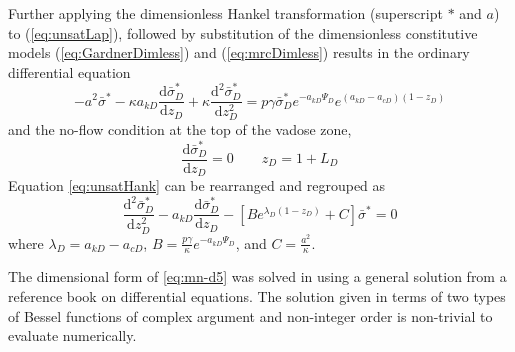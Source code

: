 \documentclass[12pt,letterpaper]{article}
\begin{document}
Further applying the dimensionless Hankel transformation (superscript $\ast$ and $a$) to (\ref{eq:unsatLap}), followed by substitution of the dimensionless constitutive models (\ref{eq:GardnerDimless}) and (\ref{eq:mrcDimless}) results in the ordinary differential equation
\begin{equation}
  \label{eq:unsatHank}
   -a^2 \bar{\sigma}^{\ast} - \kappa a_{kD} \frac{\mathrm{d} \bar{\sigma}_D^{\ast}}{\mathrm{d} z_D} + \kappa \frac{\mathrm{d}^2 \bar{\sigma}_D^{\ast}}{\mathrm{d} z_D^2}  = p \gamma \bar{\sigma}_D^{\ast}  e^{-a_{kD} \Psi_D}  e^{\left(a_{kD} -a_{cD} \right)\left( 1 - z_D\right)}  
\end{equation}
and the no-flow condition at the top of the vadose zone, 
\begin{equation}\nonumber
 \frac{\mathrm{d}\bar{\sigma}_D^{\ast}}{\mathrm{d}z_D}=0 \qquad z_D=1+L_D 
\end{equation}
Equation \ref{eq:unsatHank} can be rearranged and regrouped as
\begin{equation}
  \label{eq:mn-d5}
  \frac{\mathrm{d}^2 \bar{\sigma}_D^{\ast}}{\mathrm{d}z_D^2} - a_{kD} \frac{\mathrm{d} \bar{\sigma}_D^{\ast}}{\mathrm{d}z_D} - \left[ B e^{\lambda_D (1-z_D)} + C\right] \bar{\sigma}^{\ast}=0
\end{equation}
where $\lambda_D = a_{kD} - a_{cD}$, $B = \frac{p\gamma}{\kappa} e^{-a_{kD} \Psi_D}$, and $C=\frac{a^2}{\kappa}$.

The dimensional form of \eqref{eq:mn-d5} was solved in \cite{mishra10} using a general solution from a
reference book on differential equations.  The solution given in terms
of two types of Bessel functions of complex argument and non-integer
order is non-trivial to evaluate numerically. 
\end{document}
